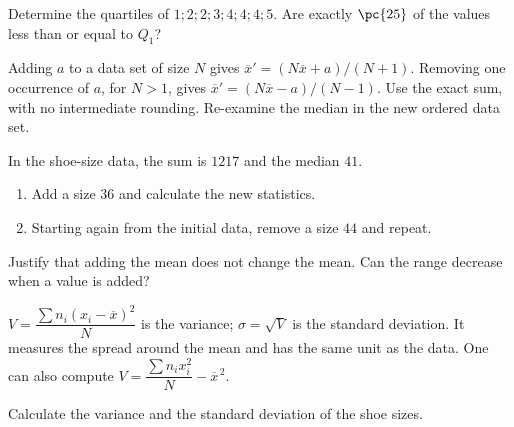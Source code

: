 \begin{example}Determine the quartiles of $1;2;2;3;4;4;4;5$. Are exactly $\pc{25}$ of the values less than or equal to $Q_1$?\end{example}
\begin{keypoint}[Properties]
Adding $a$ to a data set of size $N$ gives $\overline x'=(N\overline x+a)/(N+1)$.
Removing one occurrence of $a$, for $N>1$, gives $\overline x'=(N\overline x-a)/(N-1)$. Use the exact sum, with no intermediate rounding. Re-examine the median in the new ordered data set.
\end{keypoint}
\begin{example}In the shoe-size data, the sum is $1217$ and the median $41$.
\begin{enumerate}\item Add a size $36$ and calculate the new statistics.\item Starting again from the initial data, remove a size $44$ and repeat.\end{enumerate}\end{example}
\begin{example}Justify that adding the mean does not change the mean. Can the range decrease when a value is added?\end{example}
\begin{keypoint}[Definitions]
$V=\dfrac{\sum n_i(x_i-\overline x)^2}{N}$ is the variance; $\sigma=\sqrt V$ is the standard deviation. It measures the spread around the mean and has the same unit as the data. One can also compute $V=\dfrac{\sum n_ix_i^2}{N}-\overline x^{\,2}$.
\end{keypoint}
\begin{example}Calculate the variance and the standard deviation of the shoe sizes.\end{example}
